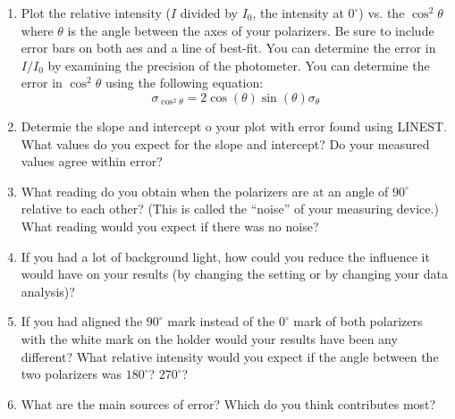 \begin{enumerate}
\item Plot the relative intensity ($I$ divided by $I_0$, the intensity at $0^{\circ}$) vs. the $\cos^2\theta$ where $\theta$ is the angle between the axes of your polarizers. Be sure to include error bars on both aes and a line of best-fit. You can determine the error in $I/I_0$ by examining the precision of the photometer. You can determine the error in $\cos^2\theta$ using the following equation:
\begin{equation}
 \sigma_{\cos^2\theta} = 2\cos(\theta)\sin(\theta)\sigma_{\theta}
\end{equation}

\item Determie the slope and intercept o your plot with error found using LINEST. What values do you expect for the slope and intercept? Do your measured values agree within error?

\item What reading do you obtain when the polarizers are at an angle of $90^{\circ}$ relative to each other? (This is called the ``noise'' of your measuring device.) What reading would you expect if there was no noise?

\item If you had a lot of background light, how could you reduce the influence it would have on your results (by changing the setting or by changing your data analysis)?

\item If you had aligned the $90^{\circ}$ mark instead of the $0^{\circ}$ mark of both polarizers with the white mark on the holder would your results have been any different? What relative intensity would you expect if the angle between the two polarizers was $180^{\circ}$? $270^{\circ}$?

\item What are the main sources of error? Which do you think contributes most?
\end{enumerate}

